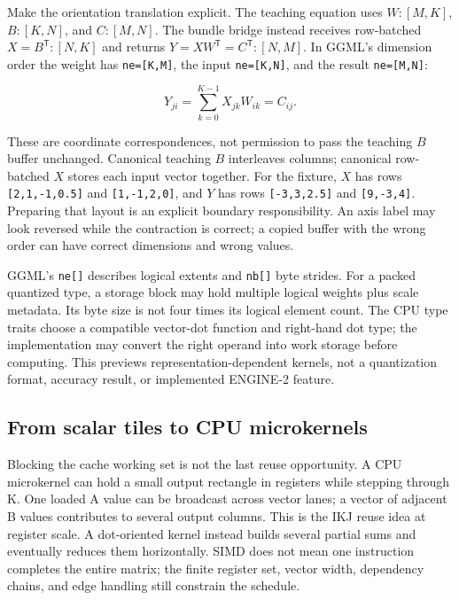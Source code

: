 \documentclass[
  10pt,
]{article}
\begin{document}
Make the orientation translation explicit. The teaching equation uses
\(W:[M,K]\), \(B:[K,N]\), and \(C:[M,N]\). The bundle bridge instead
receives row-batched \(X=B^{\mathsf T}:[N,K]\) and returns
\(Y=XW^{\mathsf T}=C^{\mathsf T}:[N,M]\). In GGML's dimension order the
weight has \texttt{ne={[}K,M{]}}, the input \texttt{ne={[}K,N{]}}, and
the result \texttt{ne={[}M,N{]}}:

\[
Y_{ji}=\sum_{k=0}^{K-1} X_{jk}W_{ik}=C_{ij}.
\]

These are coordinate correspondences, not permission to pass the
teaching \(B\) buffer unchanged. Canonical teaching \(B\) interleaves
columns; canonical row-batched \(X\) stores each input vector together.
For the fixture, \(X\) has rows \texttt{{[}2,1,-1,0.5{]}} and
\texttt{{[}1,-1,2,0{]}}, and \(Y\) has rows \texttt{{[}-3,3,2.5{]}} and
\texttt{{[}9,-3,4{]}}. Preparing that layout is an explicit boundary
responsibility. An axis label may look reversed while the contraction is
correct; a copied buffer with the wrong order can have correct
dimensions and wrong values.

GGML's \texttt{ne{[}{]}} describes logical extents and \texttt{nb{[}{]}}
byte strides. For a packed quantized type, a storage block may hold
multiple logical weights plus scale metadata. Its byte size is not four
times its logical element count. The CPU type traits choose a compatible
vector-dot function and right-hand dot type; the implementation may
convert the right operand into work storage before computing. This
previews representation-dependent kernels, not a quantization format,
accuracy result, or implemented ENGINE-2 feature.

\subsection{From scalar tiles to CPU
microkernels}\label{from-scalar-tiles-to-cpu-microkernels}

Blocking the cache working set is not the last reuse opportunity. A CPU
microkernel can hold a small output rectangle in registers while
stepping through K. One loaded A value can be broadcast across vector
lanes; a vector of adjacent B values contributes to several output
columns. This is the IKJ reuse idea at register scale. A dot-oriented
kernel instead builds several partial sums and eventually reduces them
horizontally. SIMD does not mean one instruction completes the entire
matrix; the finite register set, vector width, dependency chains, and
edge handling still constrain the schedule.
\end{document}
